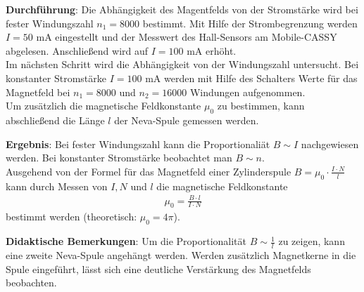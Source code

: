 \documentclass[../main.tex]{subfiles}
\begin{document}
\begin{tcolorbox}
    \vspace{0.5cm}
    \textbf{Durchführung}: Die Abhängigkeit des Magentfelds von der Stromstärke wird bei fester Windungszahl $n_1=8000$ bestimmt. Mit Hilfe der Strombegrenzung werden $I=50$ mA eingestellt und der Messwert des Hall-Sensors am Mobile-CASSY abgelesen. Anschließend wird auf $I=100$ mA erhöht.\\
    Im nächsten Schritt wird die Abhängigkeit von der Windungszahl untersucht. Bei konstanter Stromstärke $I=100$ mA werden mit Hilfe des Schalters Werte für das Magnetfeld bei $n_1=8000$ und $n_2=16000$ Windungen aufgenommen.\\
    Um zusätzlich die magnetische Feldkonstante $\mu_0$ zu bestimmen, kann abschließend die Länge $l$ der Neva-Spule gemessen werden.

    \vspace{0.5cm}
    \textbf{Ergebnis}: Bei fester Windungszahl kann die Proportionaliät $B \sim I$ nachgewiesen werden. Bei konstanter Stromstärke beobachtet man $B \sim n$.\\
    Ausgehend von der Formel für das Magnetfeld einer Zylinderspule $B=\mu_0 \cdot \frac{I \cdot N}{l}$ kann durch Messen von $I,N$ und $l$ die magnetische Feldkonstante 
    \begin{align*}
        \mu_0 = \frac{B \cdot l}{I \cdot N}
    \end{align*}
    bestimmt werden (theoretisch: $\mu_0=4\pi$).

    \vspace{0.5cm}
    \textbf{Didaktische Bemerkungen}: Um die Proportionalität $B \sim \frac{1}{l}$ zu zeigen, kann eine zweite Neva-Spule angehängt werden. Werden zusätzlich Magnetkerne in die Spule eingeführt, lässt sich eine deutliche Verstärkung des Magnetfelds beobachten.


\end{tcolorbox}
\end{document}

